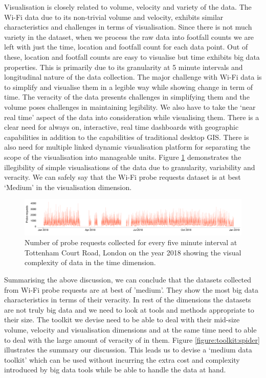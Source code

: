 Visualisation is closely related to volume, velocity and variety of the data.
The Wi-Fi data due to its non-trivial volume and velocity, exhibits similar characteristics and challenges in terms of visualisation.
Since there is not much variety in the dataset, when we process the raw data into footfall counts we are left with just the time, location and footfall count for each data point.
Out of these, location and footfall counts are easy to visualise but time exhibits big data properties.
This is primarily due to its granularity at 5 minute intervals and longitudinal nature of the data collection.
The major challenge with Wi-Fi data is to simplify and visualise them in a legible way while showing change in term of time.
The veracity of the data presents challenges in simplifying them and the volume poses challenges in maintaining legibility.
We also have to take the `near real time' aspect of the data into consideration while visualising them.
There is a clear need for always on, interactive, real time dashboards with geographic capabilities in addition to the capabilities of traditional desktop GIS.
There is also need for multiple linked dynamic visualisation platform for separating the scope of the visualisation into manageable units.
Figure \ref{figure:toolkit:visualisation} demonstrates the illegibility of simple visualisations of the data due to granularity, variability and veracity.
We can safely say that the Wi-Fi probe requests dataset is at best `Medium' in the visualisation dimension.

\begin{figure}
  \includegraphics{images/data-visualisation-challenge.png}
  \caption{Number of probe requests collected for every five minute interval at Tottenham Court Road, London on the year 2018 showing the visual complexity of data in the time dimension.}
  \label{figure:toolkit:visualisation}
\end{figure}

Summarising the above discussion, we can conclude that the datasets collected from Wi-Fi probe requests are at best of 'medium'.
They show the most big data characteristics in terms of their veracity.
In rest of the dimensions the datasets are not truly big data and we need to look at tools and methods appropriate to their size.
The toolkit we devise need to be able to deal with their mid-size volume, velocity and visualisation dimensions and at the same time need to able to deal with the large amount of veracity of in them.
Figure \ref{figure:toolkit:spider} illustrates the summary our discussion.
This leads us to devise a `medium data toolkit' which can be used without incurring the extra cost and complexity introduced by big data tools while be able to handle the data at hand.

